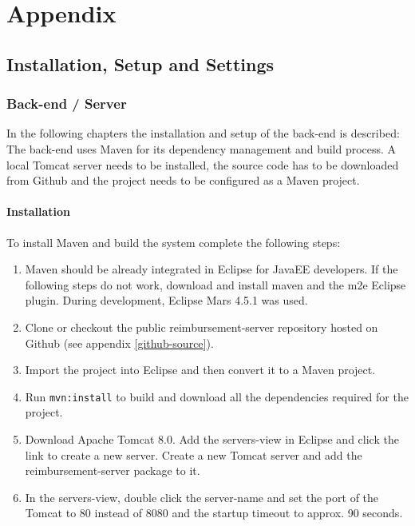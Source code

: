 \part*{Appendix}

\chapter{Installation, Setup and Settings}
\label{chap:installation}

\section{Back-end / Server}
\label{sec:backend-server}

In the following chapters the installation and setup of the back-end is described: The back-end uses Maven for its dependency management and build process. A local Tomcat server needs to be installed, the source code has to be downloaded from Github and the project needs to be configured as a Maven project.

\subsection{Installation}
To install Maven and build the system complete the following steps:

\begin{enumerate}
    \item Maven should be already integrated in Eclipse for JavaEE developers. If the following steps do not work, download and install maven and the m2e Eclipse plugin. During development, Eclipse Mars 4.5.1 was used.
    \item Clone or checkout the public reimbursement-server repository hosted on Github (see appendix \ref{github-source}).
    \item Import the project into Eclipse and then convert it to a Maven project.
    \item Run \texttt{mvn:install} to build and download all the dependencies required for the project.
    \item Download Apache Tomcat 8.0. Add the servers-view in Eclipse and click the link to create a new server. Create a new Tomcat server and add the reimbursement-server package to it.
    \item In the servers-view, double click the server-name and set the port of the Tomcat to 80 instead of 8080 and the startup timeout to approx. 90 seconds.
\end{enumerate}

